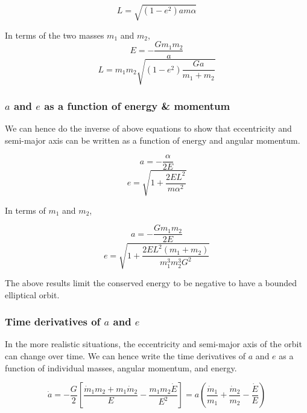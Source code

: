 \documentclass{article}
\begin{document}
\begin{equation}
    L =  \sqrt{(1-e^2)am\alpha}
\end{equation}

In terms of the two masses $m_1$ and $m_2$,
\begin{equation}
    E = -\frac{Gm_1 m_2}{a}
\end{equation}
\begin{equation}
    L =  m_1 m_2 \sqrt{(1-e^2) \frac{Ga}{m_1+m_2}}
\end{equation}

\subsubsection{$a$ and $e$ as a function of energy \& momentum}
We can hence do the inverse of above equations to show that eccentricity and semi-major axis can be written as a function of energy and angular momentum.

\begin{equation}
    a = - \frac{\alpha}{2E}
\end{equation}
\begin{equation}
    e = \sqrt{1 + \frac{2 E L^2}{m \alpha^2}}
\end{equation}

In terms of $m_1$ and $m_2$,

\begin{equation}
    a = - \frac{Gm_1 m_2}{2E}
\end{equation}
\begin{equation}
    e = \sqrt{1 + \frac{2E L^2 (m_1 + m_2)}{m_1^3 m_2^3G^2}}
\end{equation}

The above results limit the conserved energy to be negative to have a bounded elliptical orbit.

\subsubsection{Time derivatives of $a$ and $e$}
In the more realistic situations, the eccentricity and semi-major axis of the orbit can change over time. We can hence write the time derivatives of $a$ and $e$ as a function of individual masses, 
angular momentum, and energy.

\begin{equation}
    \dot{a} = -\frac{G}{2} \left[\frac{\dot m_1 m_2 + m_1 \dot m_2}{E} - \frac{m_1m_2 \dot E}{E^2}\right]
    = a \left(\frac{\dot m_1}{m_1} + \frac{\dot m_2}{m_2} - \frac{\dot E}{E}\right)
\end{equation}
\end{document}

